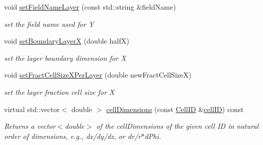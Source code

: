 \begin{DoxyCompactItemize}
void \hyperlink{class_d_d4hep_1_1_d_d_segmentation_1_1_tiled_layer_grid_x_y_a2bf0d13d0e1ea42c698c10339e220590}{set\+Field\+Name\+Layer} (const std\+::string \&field\+Name)
\begin{DoxyCompactList}\small\item\em set the field name used for Y \end{DoxyCompactList}\item 
void \hyperlink{class_d_d4hep_1_1_d_d_segmentation_1_1_tiled_layer_grid_x_y_a713a5e8262e11c1806893ead420f116d}{set\+Boundary\+LayerX} (double halfX)
\begin{DoxyCompactList}\small\item\em set the layer boundary dimension for X \end{DoxyCompactList}\item 
void \hyperlink{class_d_d4hep_1_1_d_d_segmentation_1_1_tiled_layer_grid_x_y_a89afa525c07a985c490e593f84961d7c}{set\+Fract\+Cell\+Size\+X\+Per\+Layer} (double new\+Fract\+Cell\+SizeX)
\begin{DoxyCompactList}\small\item\em set the layer fraction cell size for X \end{DoxyCompactList}\item 
virtual std\+::vector$<$ double $>$ \hyperlink{class_d_d4hep_1_1_d_d_segmentation_1_1_tiled_layer_grid_x_y_af7a8796e14934f650b301f6ca0236a8d}{cell\+Dimensions} (const \hyperlink{namespace_d_d4hep_1_1_d_d_segmentation_ac7af071d85cb48820914434a07e21ba1}{Cell\+ID} \&\hyperlink{class_d_d4hep_1_1_d_d_segmentation_1_1_tiled_layer_grid_x_y_a4fa76f53ffa685139ce759e3bb9ea1ea}{cell\+ID}) const
\begin{DoxyCompactList}\small\item\em Returns a vector$<$double$>$ of the cell\+Dimensions of the given cell ID in natural order of dimensions, e.\+g., dx/dy/dz, or dr/r$\ast$d\+Phi. \end{DoxyCompactList}\end{DoxyCompactItemize}
